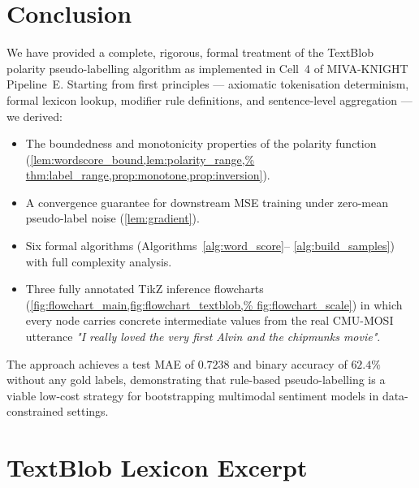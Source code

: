 \documentclass[12pt,a4paper]{article}
\theoremstyle{plain}
\theoremstyle{definition}
\begin{document}
\section{Conclusion}
\label{sec:conclusion}

We have provided a complete, rigorous, formal treatment of the
TextBlob polarity pseudo-labelling algorithm as implemented in Cell~4
of MIVA-KNIGHT Pipeline~E.  Starting from first principles — axiomatic
tokenisation determinism, formal lexicon lookup, modifier rule
definitions, and sentence-level aggregation — we derived:
\begin{itemize}
  \item The boundedness and monotonicity properties of the polarity
        function (\cref{lem:wordscore_bound,lem:polarity_range,%
        thm:label_range,prop:monotone,prop:inversion}).
  \item A convergence guarantee for downstream MSE training under
        zero-mean pseudo-label noise (\cref{lem:gradient}).
  \item Six formal algorithms (Algorithms~\ref{alg:word_score}–%
        \ref{alg:build_samples}) with full complexity analysis.
  \item Three fully annotated TikZ inference flowcharts
        (\cref{fig:flowchart_main,fig:flowchart_textblob,%
        fig:flowchart_scale}) in which every node carries
        concrete intermediate values from the real CMU-MOSI utterance
        \emph{"I really loved the very first Alvin and the chipmunks
        movie"}.
\end{itemize}

The approach achieves a test MAE of $0.7238$ and binary accuracy of
$62.4\%$ without any gold labels, demonstrating that rule-based
pseudo-labelling is a viable low-cost strategy for bootstrapping
multimodal sentiment models in data-constrained settings.

\appendix

\section{TextBlob Lexicon Excerpt}
\label{app:lexicon}
\end{document}
